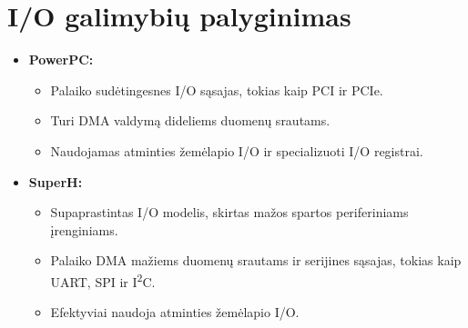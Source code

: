 \documentclass{article}
\begin{document}
\section*{I/O galimybių palyginimas}
\begin{itemize}
    \item \textbf{PowerPC:}
        \begin{itemize}
            \item Palaiko sudėtingesnes I/O sąsajas, tokias kaip PCI ir PCIe.
            \item Turi DMA valdymą dideliems duomenų srautams.
            \item Naudojamas atminties žemėlapio I/O ir specializuoti I/O registrai.
        \end{itemize}
    \item \textbf{SuperH:}
        \begin{itemize}
            \item Supaprastintas I/O modelis, skirtas mažos spartos periferiniams įrenginiams.
            \item Palaiko DMA mažiems duomenų srautams ir serijines sąsajas, tokias kaip UART, SPI ir I\textsuperscript{2}C.
            \item Efektyviai naudoja atminties žemėlapio I/O.
        \end{itemize}
\end{itemize}


 
\end{document}
